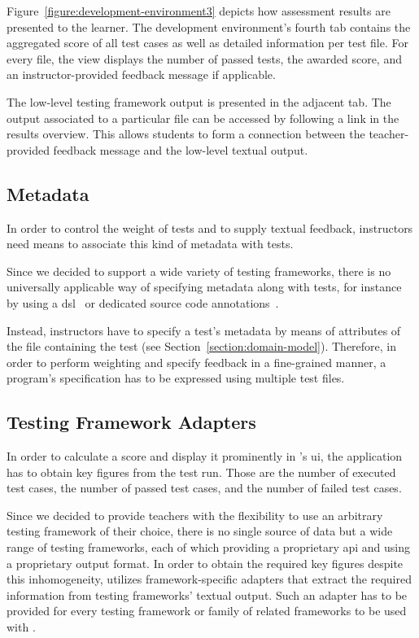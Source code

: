 Figure~\ref{figure:development-environment3} depicts how assessment results are presented to the learner. The development environment's fourth tab contains the aggregated score of all test cases as well as detailed information per test file. For every file, the view displays the number of passed tests, the awarded score, and an instructor-provided feedback message if applicable.

The low-level testing framework output is presented in the adjacent tab. The output associated to a particular file can be accessed by following a link in the results overview. This allows students to form a connection between the teacher-provided feedback message and the low-level textual output.

\subsection{Metadata}

In order to control the weight of tests and to supply textual feedback, instructors need means to associate this kind of metadata with tests.

Since we decided to support a wide variety of testing frameworks, there is no universally applicable way of specifying metadata along with tests, for instance by using a \gls{dsl}~\cite{pieterse2013automated} or dedicated source code annotations~\cite{vihavainen2013scaffolding}.

Instead, instructors have to specify a test's metadata by means of attributes of the file containing the test (see Section~\ref{section:domain-model}). Therefore, in order to perform weighting and specify feedback in a fine-grained manner, a program's specification has to be expressed using multiple test files.

\subsection{Testing Framework Adapters}

In order to calculate a score and display it prominently in \tool's \gls{ui}, the application has to obtain key figures from the test run. Those are the number of executed test cases, the number of passed test cases, and the number of failed test cases.

Since we decided to provide teachers with the flexibility to use an arbitrary testing framework of their choice, there is no single source of data but a wide range of testing frameworks, each of which providing a proprietary \gls{api} and using a proprietary output format. In order to obtain the required key figures despite this inhomogeneity, \tool utilizes framework-specific adapters that extract the required information from testing frameworks' textual output. Such an adapter has to be provided for every testing framework or family of related frameworks to be used with \tool.

